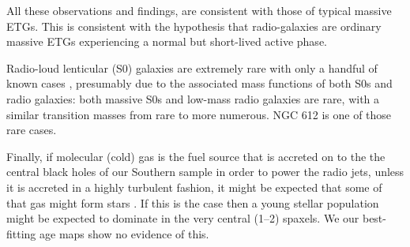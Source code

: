 	All these observations and findings, are consistent with those of typical massive ETGs. This is consistent with the hypothesis that radio-galaxies are ordinary massive ETGs experiencing a normal but short-lived active phase. 

	Radio-loud lenticular (S0) galaxies are extremely rare with only a handful of known cases \citep[e.g.][]{Heckman1982, Morganti2011}, presumably due to the associated mass functions of both S0s and radio galaxies: both massive S0s and low-mass radio galaxies are rare, with a similar transition masses from rare to more numerous. NGC 612 is one of those rare cases.

	Finally, if molecular (cold) gas is the fuel source that is accreted on to the the central black holes of our Southern sample in order to power the radio jets, unless it is accreted in a highly turbulent fashion, it might be expected that some of that gas might form stars \citep[e.g.][]{Collin1999, Diamond-Stanic2012, LaMassa2013}. If this is the case then a young stellar population might be expected to dominate in the very central (1--2) spaxels. We our best-fitting age maps show no evidence of this. 